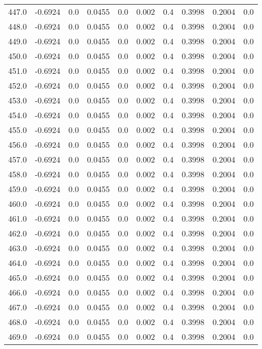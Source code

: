 \begin{longtable}{lrrrrrrrrr}
447.0 & -0.6924 & 0.0 & 0.0455 & 0.0 & 0.002 & 0.4 & 0.3998 & 0.2004 & 0.0 \\
448.0 & -0.6924 & 0.0 & 0.0455 & 0.0 & 0.002 & 0.4 & 0.3998 & 0.2004 & 0.0 \\
449.0 & -0.6924 & 0.0 & 0.0455 & 0.0 & 0.002 & 0.4 & 0.3998 & 0.2004 & 0.0 \\
450.0 & -0.6924 & 0.0 & 0.0455 & 0.0 & 0.002 & 0.4 & 0.3998 & 0.2004 & 0.0 \\
451.0 & -0.6924 & 0.0 & 0.0455 & 0.0 & 0.002 & 0.4 & 0.3998 & 0.2004 & 0.0 \\
452.0 & -0.6924 & 0.0 & 0.0455 & 0.0 & 0.002 & 0.4 & 0.3998 & 0.2004 & 0.0 \\
453.0 & -0.6924 & 0.0 & 0.0455 & 0.0 & 0.002 & 0.4 & 0.3998 & 0.2004 & 0.0 \\
454.0 & -0.6924 & 0.0 & 0.0455 & 0.0 & 0.002 & 0.4 & 0.3998 & 0.2004 & 0.0 \\
455.0 & -0.6924 & 0.0 & 0.0455 & 0.0 & 0.002 & 0.4 & 0.3998 & 0.2004 & 0.0 \\
456.0 & -0.6924 & 0.0 & 0.0455 & 0.0 & 0.002 & 0.4 & 0.3998 & 0.2004 & 0.0 \\
457.0 & -0.6924 & 0.0 & 0.0455 & 0.0 & 0.002 & 0.4 & 0.3998 & 0.2004 & 0.0 \\
458.0 & -0.6924 & 0.0 & 0.0455 & 0.0 & 0.002 & 0.4 & 0.3998 & 0.2004 & 0.0 \\
459.0 & -0.6924 & 0.0 & 0.0455 & 0.0 & 0.002 & 0.4 & 0.3998 & 0.2004 & 0.0 \\
460.0 & -0.6924 & 0.0 & 0.0455 & 0.0 & 0.002 & 0.4 & 0.3998 & 0.2004 & 0.0 \\
461.0 & -0.6924 & 0.0 & 0.0455 & 0.0 & 0.002 & 0.4 & 0.3998 & 0.2004 & 0.0 \\
462.0 & -0.6924 & 0.0 & 0.0455 & 0.0 & 0.002 & 0.4 & 0.3998 & 0.2004 & 0.0 \\
463.0 & -0.6924 & 0.0 & 0.0455 & 0.0 & 0.002 & 0.4 & 0.3998 & 0.2004 & 0.0 \\
464.0 & -0.6924 & 0.0 & 0.0455 & 0.0 & 0.002 & 0.4 & 0.3998 & 0.2004 & 0.0 \\
465.0 & -0.6924 & 0.0 & 0.0455 & 0.0 & 0.002 & 0.4 & 0.3998 & 0.2004 & 0.0 \\
466.0 & -0.6924 & 0.0 & 0.0455 & 0.0 & 0.002 & 0.4 & 0.3998 & 0.2004 & 0.0 \\
467.0 & -0.6924 & 0.0 & 0.0455 & 0.0 & 0.002 & 0.4 & 0.3998 & 0.2004 & 0.0 \\
468.0 & -0.6924 & 0.0 & 0.0455 & 0.0 & 0.002 & 0.4 & 0.3998 & 0.2004 & 0.0 \\
469.0 & -0.6924 & 0.0 & 0.0455 & 0.0 & 0.002 & 0.4 & 0.3998 & 0.2004 & 0.0 \\

\end{longtable}
